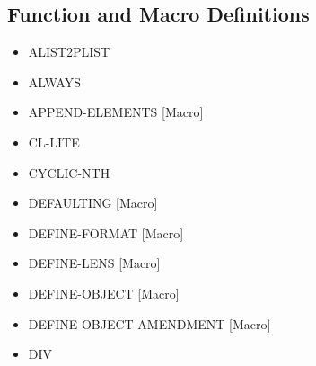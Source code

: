 \documentclass [11pt]{book}
\begin{document}
\subsection{Function and Macro Definitions}

\label{subsec:functionandmacrodefinitions}



\begin{itemize}

\item {}ALIST2PLIST





\item {}ALWAYS





\item {}APPEND-ELEMENTS [Macro]





\item {}CL-LITE





\item {}CYCLIC-NTH





\item {}DEFAULTING [Macro]





\item {}DEFINE-FORMAT [Macro]





\item {}DEFINE-LENS [Macro]





\item {}DEFINE-OBJECT [Macro]





\item {}DEFINE-OBJECT-AMENDMENT [Macro]





\item {}DIV






\end{itemize}
\end{document}
